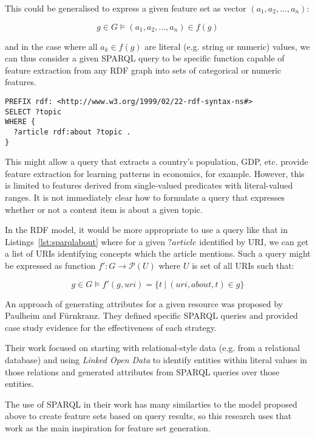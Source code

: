This could be generalised to express a given feature set as
vector $(a_1, a_2, ..., a_n)$:

$$
g \in G \models (a_1, a_2, ..., a_n) \in f(g)
$$

\noindent and in the case where all $a_k \in f(g)$ are literal (e.g. string or
numeric) values, we can thus consider a given SPARQL query to be specific
function capable of feature extraction from any RDF graph into sets of
categorical or numeric features.

\begin{lstlisting}[label=lst:sparqlabout,caption={SPARQL query to determine what },language=sparql]
PREFIX rdf: <http://www.w3.org/1999/02/22-rdf-syntax-ns#>
SELECT ?topic
WHERE {
  ?article rdf:about ?topic .
}
\end{lstlisting}

This might allow a query that extracts a country's population, GDP, etc.
provide feature extraction for learning patterns in economics, for example.
However, this is limited to features derived from single-valued predicates
with literal-valued ranges. It is not immediately clear how to formulate a
query that expresses whether or not a content item is about a given topic.

In the RDF
model, it would be more appropriate to use a query like that in
Listings~\ref{lst:sparqlabout} where for a given $?article$ identified by
URI, we can get a list of URIs identifying concepts which the article mentions.
Such a query might be expressed as function $f': G \rightarrow \mathcal P(U)$ where $U$ is
set of all URIs such that:

$$
g \in G \models f'(g, uri) = \{t \: | \: (uri, about, t) \in g\}
$$

An approach of generating attributes for a given resource was proposed by
Paulheim and F\"urnkranz\cite{paulheim2012unsupervised}. They defined specific
SPARQL queries and provided case study evidence for the effectiveness of
each strategy.

Their work focused on starting with relational-style data (e.g. from a
relational database) and using \emph{Linked Open Data} to identify entities
within literal values in those relations and generated attributes from
SPARQL queries over those entities.

The use of SPARQL in their work has many similarties to the model proposed
above to create feature sets based on query results, so this research uses
that work as the main inspiration for feature set generation.

